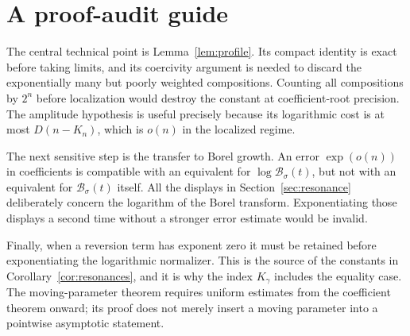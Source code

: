 \documentclass[11pt,a4paper]{article}
\numberwithin{equation}{section}
\theoremstyle{definition}
\theoremstyle{remark}
\newcommand{\Bcal}{\mathcal B}
\begin{document}
\section{A proof-audit guide}
\label{app:audit}

The central technical point is Lemma~\ref{lem:profile}. Its compact
identity is exact before taking limits, and its coercivity argument is
needed to discard the exponentially many but poorly weighted
compositions. Counting all compositions by $2^n$ before localization
would destroy the constant at coefficient-root precision. The amplitude
hypothesis is useful precisely because its logarithmic cost is at most
$D(n-K_n)$, which is $o(n)$ in the localized regime.

The next sensitive step is the transfer to Borel growth. An error
$\exp(o(n))$ in coefficients is compatible with an equivalent for
$\log\Bcal_\sigma(t)$, but not with an equivalent for
$\Bcal_\sigma(t)$ itself. All the displays in
Section~\ref{sec:resonance} deliberately concern the logarithm of the
Borel transform. Exponentiating those displays a second time without a
stronger error estimate would be invalid.

Finally, when a reversion term has exponent zero it must be retained
before exponentiating the logarithmic normalizer. This is the source of
the constants in Corollary~\ref{cor:resonances}, and it is why the index
$K_\gamma$ includes the equality case. The moving-parameter theorem
requires uniform estimates from the coefficient theorem onward; its
proof does not merely insert a moving parameter into a pointwise
asymptotic statement.
\end{document}
